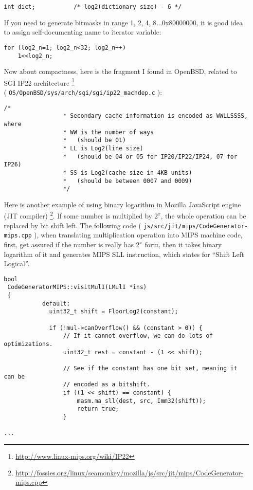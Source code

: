\begin{lstlisting}[caption=C code]
    int dict;           /* log2(dictionary size) - 6 */
\end{lstlisting}

If you need to generate bitmasks in range 1, 2, 4, 8...0x80000000, it is good idea to assign self-documenting name to iterator variable:

\begin{lstlisting}[caption=C code]
for (log2_n=1; log2_n<32; log2_n++)
    1<<log2_n;
\end{lstlisting}

Now about compactness, here is the fragment I found in OpenBSD, related to SGI IP22 architecture
\footnote{\url{http://www.linux-mips.org/wiki/IP22}} \\
( \texttt{OS/OpenBSD/sys/arch/sgi/sgi/ip22\_machdep.c} ):

\begin{lstlisting}[caption=C code]
                /*
                 * Secondary cache information is encoded as WWLLSSSS, where
                 * WW is the number of ways
                 *   (should be 01)
                 * LL is Log2(line size)
                 *   (should be 04 or 05 for IP20/IP22/IP24, 07 for IP26)
                 * SS is Log2(cache size in 4KB units)
                 *   (should be between 0007 and 0009)
                 */
\end{lstlisting}

Here is another example of using binary logarithm in Mozilla JavaScript engine (JIT compiler)
\footnote{\url{http://fossies.org/linux/seamonkey/mozilla/js/src/jit/mips/CodeGenerator-mips.cpp}}.
If some number is multiplied by $2^x$, the whole operation can be replaced by bit shift left.
The following code ( \texttt{js/src/jit/mips/CodeGenerator-mips.cpp} ), 
when translating multiplication operation into MIPS machine code, first, get assured if the number 
is really has $2^x$ form, then it takes binary logarithm of it and generates MIPS SLL instruction, which states for ``Shift Left Logical''.

\begin{lstlisting}[caption=Mozilla JavaScript JIT compiler (translating multiplication operation into MIPS bit shift instruction)]
bool
 CodeGeneratorMIPS::visitMulI(LMulI *ins)
 {
           default:
             uint32_t shift = FloorLog2(constant);
 
             if (!mul->canOverflow() && (constant > 0)) {
                 // If it cannot overflow, we can do lots of optimizations.
                 uint32_t rest = constant - (1 << shift);
 
                 // See if the constant has one bit set, meaning it can be
                 // encoded as a bitshift.
                 if ((1 << shift) == constant) {
                     masm.ma_sll(dest, src, Imm32(shift));
                     return true;
                 }

...

\end{lstlisting}

